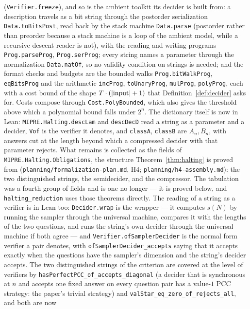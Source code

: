 \begin{remark}
(\texttt{Verifier.freeze}), and so is the ambient toolkit its decider is built from: a
description travels as a bit string through the postorder serialization
\texttt{Data.toBitsPost}, read back by the stack machine \texttt{Data.parse} (postorder
rather than preorder because a stack machine is a loop of the ambient model, while a
recursive-descent reader is not), with the reading and writing programs
\texttt{Prog.parseProg}, \texttt{Prog.serProg}; every string names a parameter through the
normalization \texttt{Data.natOf}, so no validity condition on strings is needed; and the
format checks and budgets are the bounded walks \texttt{Prog.bitWalkProg},
\texttt{eqBitsProg} and the arithmetic \texttt{incProg}, \texttt{toUnaryProg},
\texttt{mulProg}, \texttt{polyProg}, each with a cost bound of the shape
$T \cdot (\left\vert {\text{input}} \right\vert + 1)$ that Definition~\ref{def:decider} asks for. Costs compose
through \texttt{Cost.PolyBounded}, which also gives the threshold above which a polynomial
bound falls under $2^n$. The dictionary itself is now in Lean: \texttt{MIPRE.Halting.descLam}
and \texttt{descDecD} read a string as a parameter and a decider, \texttt{Vof} is the verifier
it denotes, and \texttt{classA}, \texttt{classB} are $A_n, B_n$, with answers cut at the
length beyond which a compressed decider with that parameter rejects. What remains is
collected as the fields of \texttt{MIPRE.Halting.Obligations}, the structure
Theorem~\ref{thm:halting} is proved from
(\texttt{planning/formalization-plan.md}, H4; \texttt{planning/h4-assembly.md}): the two
distinguished strings, the semidecider, and the compressor. The tabulation was a fourth group
of fields and is one no longer --- it is proved below, and \texttt{halting\_reduction} uses
those theorems directly.
The reading of a string as a verifier is in
Lean too: \texttt{Decider.wrap} is the wrapper --- it computes $s(N)$ by running the
sampler through the universal machine, compares it with the lengths of the two questions,
and runs the string's own decider through the universal machine if both agree --- and
\texttt{Verifier.ofSamplerDecider} is the normal form verifier a pair denotes, with
\texttt{ofSamplerDecider\_accepts} saying that it accepts exactly when the questions have
the sampler's dimension and the string's decider accepts. The two distinguished strings of
the criterion are covered at the level of verifiers by
\texttt{hasPerfectPCC\_of\_accepts\_diagonal} (a decider that is synchronous at $n$ and
accepts one fixed answer on every question pair has a value-$1$ PCC strategy: the paper's
trivial strategy) and \texttt{valStar\_eq\_zero\_of\_rejects\_all}, and both are now

\end{remark}
